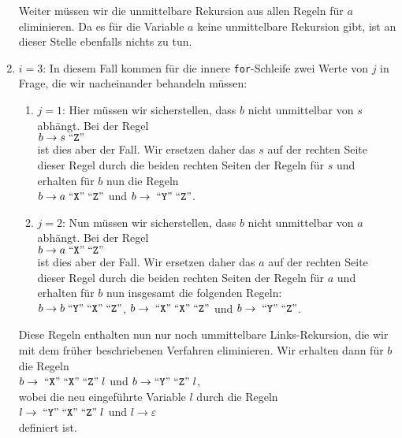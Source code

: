 \begin{enumerate}
      Weiter m\"ussen wir die unmittelbare Rekursion aus allen Regeln f\"ur $a$ eliminieren.  Da 
      es f\"ur die Variable $a$ keine unmittelbare Rekursion gibt, ist an dieser Stelle ebenfalls nichts
      zu tun.
\item $i = 3$:  In diesem Fall kommen f\"ur die innere \texttt{for}-Schleife zwei Werte von $j$
      in Frage, die wir nacheinander behandeln m\"ussen:
      \begin{enumerate}
      \item $j = 1$:  Hier m\"ussen wir sicherstellen, dass $b$ nicht unmittelbar von $s$ abh\"angt.
            Bei der Regel
            \\[0.2cm]
            \hspace*{1.3cm}
            $b \rightarrow s \;\mbox{``\texttt{Z}''}\;$
            \\[0.2cm]
            ist dies aber der Fall.  Wir ersetzen daher das $s$ auf der rechten Seite dieser Regel
            durch die beiden rechten Seiten der Regeln f\"ur $s$ und erhalten f\"ur $b$ nun die Regeln
            \\[0.2cm]
            \hspace*{1.3cm}
            $b \rightarrow a \;\mbox{``\texttt{X}''}\; \mbox{``\texttt{Z}''}$ \quad und \quad
            $b \rightarrow \;\mbox{``\texttt{Y}''}\; \mbox{``\texttt{Z}''}$.
      \item $j = 2$:  Nun m\"ussen wir sicherstellen, dass $b$ nicht unmittelbar von $a$ abh\"angt.
            Bei der Regel
            \\[0.2cm]
            \hspace*{1.3cm}
            $b \rightarrow a \;\mbox{``\texttt{X}''}\; \mbox{``\texttt{Z}''}$ 
            \\[0.2cm]
            ist dies aber der Fall.  Wir ersetzen daher das $a$ auf der rechten Seite dieser Regel
            durch die beiden rechten Seiten der Regeln f\"ur $a$ und erhalten f\"ur $b$ nun insgesamt
            die folgenden Regeln:
            \\[0.2cm]
            \hspace*{1.3cm}
            $b \rightarrow b \;\mbox{``\texttt{Y}''}\; \mbox{``\texttt{X}''}\; \mbox{``\texttt{Z}''}$, \quad 
            $b \rightarrow \;\mbox{``\texttt{X}''}\; \mbox{``\texttt{X}''}\; \mbox{``\texttt{Z}''}$ \quad und \quad
            $b \rightarrow \;\mbox{``\texttt{Y}''}\; \mbox{``\texttt{Z}''}$.
      \end{enumerate}
      Diese Regeln enthalten nun nur noch ummittelbare Links-Rekursion, die wir mit dem fr\"uher
      beschriebenen Verfahren eliminieren.  Wir erhalten dann f\"ur $b$ die Regeln
      \\[0.2cm]
      \hspace*{1.3cm}
      $b \rightarrow \;\mbox{``\texttt{X}''}\; \mbox{``\texttt{X}''} \; \mbox{``\texttt{Z}''}\; l$ \quad und \quad
      $b \rightarrow \mbox{``\texttt{Y}''} \;\mbox{``\texttt{Z}''}\; l$,
      \\[0.2cm]
      wobei die neu eingef\"uhrte Variable $l$ durch die Regeln
      \\[0.2cm]
      \hspace*{1.3cm}
      $l \rightarrow \;\mbox{``\texttt{Y}''}\; \mbox{``\texttt{X}''}\; \mbox{``\texttt{Z}''}\; l$ \quad und \quad 
      $l \rightarrow \varepsilon$
      \\[0.2cm]
      definiert ist.
\end{enumerate}
